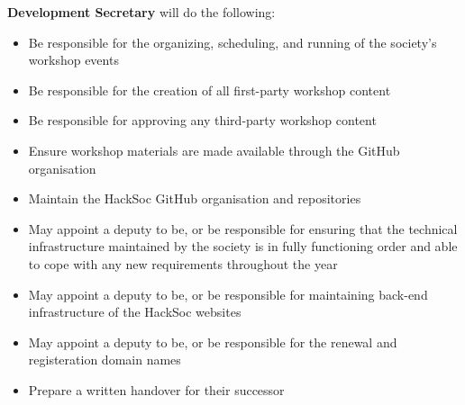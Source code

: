 \begin{subclause}
  \textbf{Development Secretary} will do the following: 
  \begin{itemize}[label=--,topsep=0em,itemsep=0em]
    \item Be responsible for the organizing, scheduling, and running of the society's workshop events
    \item Be responsible for the creation of all first-party workshop content
    \item Be responsible for approving any third-party workshop content
    \item Ensure workshop materials are made available through the GitHub organisation
    \item Maintain the HackSoc GitHub organisation and repositories
    \item May appoint a deputy to be, or be responsible for ensuring that the technical infrastructure maintained by the society is in fully functioning order and able to cope with any new requirements throughout the year
    \item May appoint a deputy to be, or be responsible for maintaining back-end infrastructure of the HackSoc websites
    \item May appoint a deputy to be, or be responsible for the renewal and registeration domain names
    \item Prepare a written handover for their successor
  \end{itemize}
\end{subclause}
